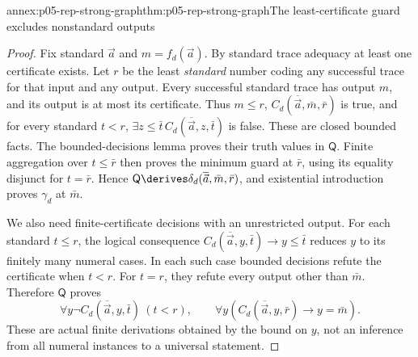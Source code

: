 \begin{annexitem}{annex:p05-rep-strong-graph}{thm:p05-rep-strong-graph}{The least-certificate guard excludes nonstandard outputs}
\begin{proof}
Fix standard \(\vec a\) and \(m=f_d(\vec a)\). By standard trace
adequacy at least one certificate exists. Let \(r\) be the least
\emph{standard} number coding any successful trace for that input and
any output. Every successful standard trace has output \(m\), and its
output is at most its certificate. Thus \(m\leq r\),
\(C_d(\overline{\vec a},\bar m,\bar r)\) is true, and for every
standard \(t<r\),
\(\exists z\leq\bar t\,C_d(\overline{\vec a},z,\bar t)\) is false.
These are closed bounded facts. The bounded-decisions lemma proves their
truth values in \(\mathsf Q\). Finite aggregation over \(t\leq\bar r\)
then proves the minimum guard at \(\bar r\), using its equality
disjunct for \(t=\bar r\). Hence
\(\mathsf Q\derives\delta_d(\overline{\vec a},\bar m,\bar r)\),
and existential introduction proves \(\gamma_d\) at \(\bar m\).

We also need finite-certificate decisions with an unrestricted output.
For each standard \(t\leq r\), the logical consequence
\(C_d(\overline{\vec a},y,\bar t)\to y\leq\bar t\) reduces \(y\)
to its finitely many numeral cases. In each such case bounded decisions
refute the certificate when \(t<r\). For \(t=r\), they refute every
output other than \(\bar m\). Therefore \(\mathsf Q\) proves
\[
 \forall y\neg C_d(\overline{\vec a},y,\bar t)\ (t<r),\qquad
 \forall y(C_d(\overline{\vec a},y,\bar r)\to y=\bar m).
\]
These are actual finite derivations obtained by the bound on \(y\), not
an inference from all numeral instances to a universal statement.


\end{proof}
\end{annexitem}
